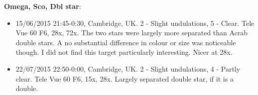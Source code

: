 {\bf Omega, Sco, Dbl star}:
\begin{itemize}
\item 15/06/2015 21:45-0:30, Cambridge, UK. 2 - Slight undulations, 5 - Clear. Tele Vue 60 F6, 28x, 72x. The two stars were largely more separated than Acrab double stars. A no substantial difference in colour or size was noticeable though. I did not find this target particularly interesting. Nicer at 28x.
\item 22/07/2015 22:50-0:00, Cambridge, UK. 2 - Slight undulations, 4 - Partly clear. Tele Vue 60 F6, 15x, 28x. Largely separated double star, if it is a double.
\end{itemize}
